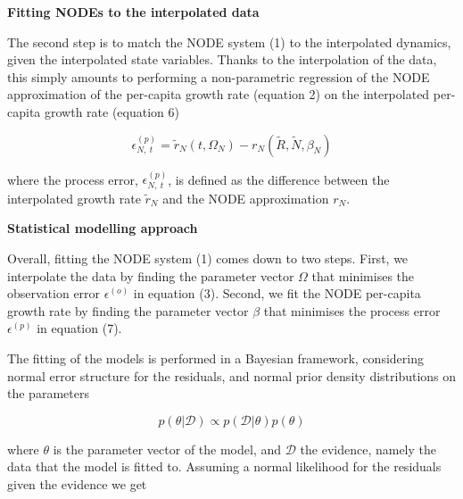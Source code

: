 \documentclass[11pt, oneside]{article}
\begin{document}

\textbf{Fitting NODEs to the interpolated data}

The second step is to match the NODE system (1) to the interpolated dynamics, given the interpolated state variables.
Thanks to the interpolation of the data, this simply amounts to performing a non-parametric regression of the NODE approximation of the per-capita growth rate (equation 2) on the interpolated per-capita growth rate (equation 6)

\begin{equation}
    \epsilon^{(p)}_{N,~t} = \tilde{r}_N (t,\Omega_N) - r_N \left( \tilde{R},\tilde{N},\beta_N \right)
\end{equation}

where the process error, $\epsilon^{(p)}_{N,~t}$, is defined as the difference between the interpolated growth rate $\tilde{r}_N$ and the NODE approximation $r_N$. 

\textbf{Statistical modelling approach}

Overall, fitting the NODE system (1) comes down to two steps. 
First, we interpolate the data by finding the parameter vector $\Omega$ that minimises the observation error $\epsilon^{(o)}$ in equation (3).
Second, we fit the NODE per-capita growth rate by finding the parameter vector $\beta$ that minimises the process error $\epsilon^{(p)}$ in equation (7).

The fitting of the models is performed in a Bayesian framework, considering normal error structure for the residuals, and normal prior density distributions on the parameters

\begin{equation}
	p(\theta | \mathcal{D}) \propto  p(\mathcal{D} | \theta) p(\theta)
\end{equation}

where $\theta$ is the parameter vector of the model, and $\mathcal{D}$ the evidence, namely the data that the model is fitted to.
Assuming a normal likelihood for the residuals given the evidence we get
\end{document}
